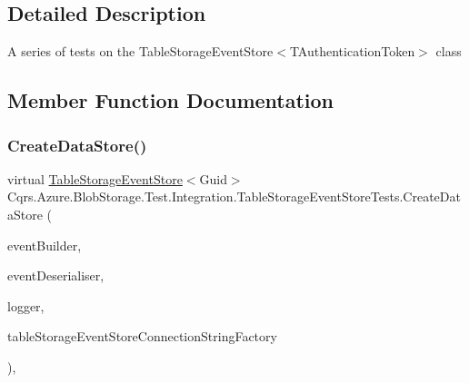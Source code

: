 \subsection{Detailed Description}
A series of tests on the Table\+Storage\+Event\+Store$<$\+T\+Authentication\+Token$>$ class 



\subsection{Member Function Documentation}
\mbox{\label{classCqrs_1_1Azure_1_1BlobStorage_1_1Test_1_1Integration_1_1TableStorageEventStoreTests_aa2b40be10577126372049c14fd951e17}} 
\subsubsection{\texorpdfstring{Create\+Data\+Store()}{CreateDataStore()}}
{\footnotesize\ttfamily virtual \hyperlink{classCqrs_1_1Azure_1_1BlobStorage_1_1Events_1_1TableStorageEventStore}{Table\+Storage\+Event\+Store}$<$Guid$>$ Cqrs.\+Azure.\+Blob\+Storage.\+Test.\+Integration.\+Table\+Storage\+Event\+Store\+Tests.\+Create\+Data\+Store (\begin{DoxyParamCaption}\item[{\hyperlink{interfaceCqrs_1_1Events_1_1IEventBuilder}{I\+Event\+Builder}$<$ Guid $>$}]{event\+Builder,  }\item[{\hyperlink{interfaceCqrs_1_1Events_1_1IEventDeserialiser}{I\+Event\+Deserialiser}$<$ Guid $>$}]{event\+Deserialiser,  }\item[{I\+Logger}]{logger,  }\item[{\hyperlink{interfaceCqrs_1_1Azure_1_1BlobStorage_1_1ITableStorageStoreConnectionStringFactory}{I\+Table\+Storage\+Store\+Connection\+String\+Factory}}]{table\+Storage\+Event\+Store\+Connection\+String\+Factory }\end{DoxyParamCaption})\hspace{0.3cm}{\ttfamily [protected]}, {\ttfamily [virtual]}}



